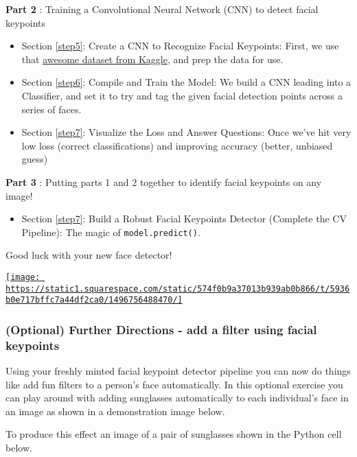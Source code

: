 \documentclass[11pt]{article}
\makeatletter
\def\maxwidth{\ifdim\Gin@nat@width>\linewidth\linewidth
    \else\Gin@nat@width\fi}
\let\Oldincludegraphics\includegraphics
\renewcommand{\includegraphics}[1]{\Oldincludegraphics[width=.8\maxwidth]{#1}}
\providecommand{\tightlist}{%
      \setlength{\itemsep}{0pt}\setlength{\parskip}{0pt}}
\makeatother
\begin{document}
\textbf{Part 2} : Training a Convolutional Neural Network (CNN) to
detect facial keypoints

\begin{itemize}
\tightlist
\item
  Section \ref{step5}: Create a CNN to Recognize Facial Keypoints:
  First, we use that
  \href{https://www.kaggle.com/c/facial-keypoints-detection/data}{awesome
  dataset from Kaggle}, and prep the data for use.
\item
  Section \ref{step6}: Compile and Train the Model: We build a CNN
  leading into a Classifier, and set it to try and tag the given facial
  detection points across a series of faces.
\item
  Section \ref{step7}: Visualize the Loss and Answer Questions: Once
  we've hit very low loss (correct classifications) and improving
  accuracy (better, unbiased guess)
\end{itemize}

\textbf{Part 3} : Putting parts 1 and 2 together to identify facial
keypoints on any image!

\begin{itemize}
\tightlist
\item
  Section \ref{step7}: Build a Robust Facial Keypoints Detector
  (Complete the CV Pipeline): The magic of \texttt{model.predict()}.
\end{itemize}

    Good luck with your new face detector!

\href{http://cs231n.stanford.edu/}{\texttt{[image: https://static1.squarespace.com/static/574f0b9a37013b939ab0b866/t/5936b0e717bffc7a44df2ca0/1496756488470/]}}

    \subsubsection{(Optional) Further Directions - add a filter using facial
keypoints}\label{optional-further-directions---add-a-filter-using-facial-keypoints}

Using your freshly minted facial keypoint detector pipeline you can now
do things like add fun filters to a person's face automatically. In this
optional exercise you can play around with adding sunglasses
automatically to each individual's face in an image as shown in a
demonstration image below.

To produce this effect an image of a pair of sunglasses shown in the
Python cell below.
\end{document}
